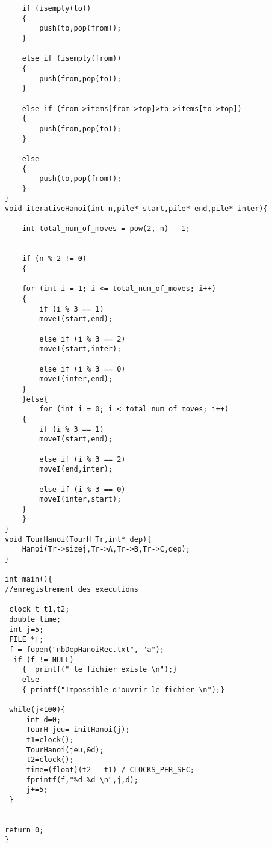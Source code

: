 \begin{verbatim}
    if (isempty(to))
    {
        push(to,pop(from));
    }
 
    else if (isempty(from))
    {
        push(from,pop(to));
    }
 
    else if (from->items[from->top]>to->items[to->top])
    {
        push(from,pop(to));
    }
 
    else
    {
        push(to,pop(from));
    }
}
void iterativeHanoi(int n,pile* start,pile* end,pile* inter){
    
    int total_num_of_moves = pow(2, n) - 1;
    
    
    if (n % 2 != 0)
    {
 
    for (int i = 1; i <= total_num_of_moves; i++)
    {
        if (i % 3 == 1)
        moveI(start,end);
 
        else if (i % 3 == 2)
        moveI(start,inter);
 
        else if (i % 3 == 0)
        moveI(inter,end);
    }
    }else{
        for (int i = 0; i < total_num_of_moves; i++)
    {
        if (i % 3 == 1)
        moveI(start,end);
 
        else if (i % 3 == 2)
        moveI(end,inter);
 
        else if (i % 3 == 0)
        moveI(inter,start);
    }
    }
}
void TourHanoi(TourH Tr,int* dep){
	Hanoi(Tr->sizej,Tr->A,Tr->B,Tr->C,dep);
}

int main(){
//enregistrement des executions

 clock_t t1,t2;
 double time;
 int j=5;
 FILE *f;
 f = fopen("nbDepHanoiRec.txt", "a");
  if (f != NULL)
    {  printf(" le fichier existe \n");}
    else
    { printf("Impossible d'ouvrir le fichier \n");}

 while(j<100){
     int d=0;
     TourH jeu= initHanoi(j);
     t1=clock();
     TourHanoi(jeu,&d);
     t2=clock();
     time=(float)(t2 - t1) / CLOCKS_PER_SEC;
     fprintf(f,"%d %d \n",j,d);
     j+=5;
 }


return 0;
}

\end{verbatim}